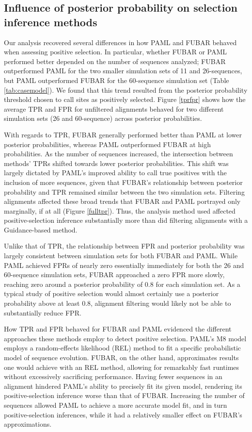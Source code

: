 \documentclass[10pt]{article}
\begin{document}
\subsection*{Influence of posterior probability on selection inference methods}

Our analysis recovered several differences in how PAML and FUBAR behaved when assessing positive selection. In particular, whether FUBAR or PAML performed better depended on the number of sequences analyzed; FUBAR outperformed PAML for the two smaller simulation sets of 11 and 26-sequences, but PAML outperformed FUBAR for the 60-sequence simulation set (Table \ref{tab:casemodel}). We found that this trend resulted from the posterior probability threshold chosen to call sites as positively selected. Figure \ref{tprfpr} shows how the average TPR and FPR for unfiltered alignments behaved for two different simulation sets (26 and 60-sequence) across posterior probabilities. 

With regards to TPR, FUBAR generally performed better than PAML at lower posterior probabilities, whereas PAML outperformed FUBAR at high probabilities. As the number of sequences increased, the intersection between methods' TPRs shifted towards lower posterior probabilities. This shift was largely dictated by PAML's improved ability to call true positives with the inclusion of more sequences, given that FUBAR's relationship between posterior probability and TPR remained similar between the two simulation sets.  Filtering alignments affected these broad trends that FUBAR and PAML portrayed only marginally, if at all (Figure \ref{fulltpr}). Thus, the analysis method used affected positive-selection inference substantially more than did filtering  alignments with a Guidance-based method. 

Unlike that of TPR, the relationship between FPR and posterior probability was largely consistent between simulation sets for both FUBAR and PAML. While PAML achieved FPRs of nearly zero essentially immediately for both the 26 and 60-sequence simulation sets, FUBAR approached a zero FPR more slowly, reaching zero around a posterior probability of 0.8 for each simulation set. As a typical study of positive selection would almost certainly use a posterior probability above at least 0.8, alignment filtering would likely not be able to substantially reduce FPR.

How TPR and FPR behaved for FUBAR and PAML evidenced the different approaches these methods employ to detect positive selection. PAML's M8 model employs a random-effects likelihood (REL) method \citep{NielsenYang1998} to fit a specific probabilistic model of sequence evolution. FUBAR, on the other hand, approximates results one would achieve with an REL method, allowing for remarkably fast runtimes without excessively sacrificing performance. Having fewer sequences in an alignment hindered PAML's ability to precisely fit its given model, rendering its positive-selection inference worse than that of FUBAR. Increasing the number of sequences allowed PAML to achieve a more accurate model fit, and in turn positive-selection inferences, while it had a relatively smaller effect on FUBAR's approximations.
\end{document}
